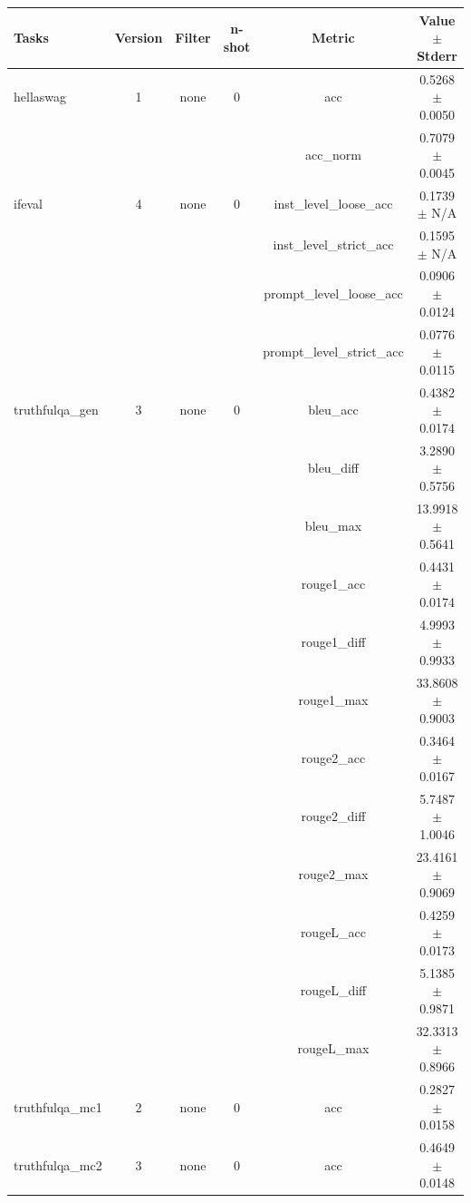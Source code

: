 \documentclass{ifacconf}
\begin{document}
\begin{strip}
\begin{minipage}{\textwidth}
			\begin{table}[H]
				\centering
				\begin{tabular}{|l|c|c|c|c|c|}
					\hline
					\textbf{Tasks} & \textbf{Version} & \textbf{Filter} & \textbf{n-shot} & \textbf{Metric} & \textbf{Value} $\pm$ \textbf{Stderr} \\ \hline
					hellaswag & 1 & none & 0 & acc & 0.5268 $\pm$ 0.0050 \\ \hline
					& & & & acc\_norm & 0.7079 $\pm$ 0.0045 \\ \hline
					ifeval & 4 & none & 0 & inst\_level\_loose\_acc & 0.1739 $\pm$ N/A \\ \hline
					& & & & inst\_level\_strict\_acc & 0.1595 $\pm$ N/A \\ \hline
					& & & & prompt\_level\_loose\_acc & 0.0906 $\pm$ 0.0124 \\ \hline
					& & & & prompt\_level\_strict\_acc & 0.0776 $\pm$ 0.0115 \\ \hline
					truthfulqa\_gen & 3 & none & 0 & bleu\_acc & 0.4382 $\pm$ 0.0174 \\ \hline
					& & & & bleu\_diff & 3.2890 $\pm$ 0.5756 \\ \hline
					& & & & bleu\_max & 13.9918 $\pm$ 0.5641 \\ \hline
					& & & & rouge1\_acc & 0.4431 $\pm$ 0.0174 \\ \hline
					& & & & rouge1\_diff & 4.9993 $\pm$ 0.9933 \\ \hline
					& & & & rouge1\_max & 33.8608 $\pm$ 0.9003 \\ \hline
					& & & & rouge2\_acc & 0.3464 $\pm$ 0.0167 \\ \hline
					& & & & rouge2\_diff & 5.7487 $\pm$ 1.0046 \\ \hline
					& & & & rouge2\_max & 23.4161 $\pm$ 0.9069 \\ \hline
					& & & & rougeL\_acc & 0.4259 $\pm$ 0.0173 \\ \hline
					& & & & rougeL\_diff & 5.1385 $\pm$ 0.9871 \\ \hline
					& & & & rougeL\_max & 32.3313 $\pm$ 0.8966 \\ \hline
					truthfulqa\_mc1 & 2 & none & 0 & acc & 0.2827 $\pm$ 0.0158 \\ \hline
					truthfulqa\_mc2 & 3 & none & 0 & acc & 0.4649 $\pm$ 0.0148 \\ \hline
				\end{tabular}
				\label{tab:llama31_q4km}
			\end{table}
			

\end{minipage}
\end{strip}
\end{document}
